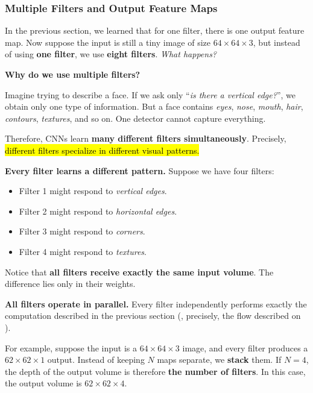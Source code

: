 \subsubsection{Multiple Filters and Output Feature Maps}\label{sec:multiple-filters-and-output-feature-maps}

In the previous section, we learned that for one filter, there is one output feature map. Now suppose the input is still a tiny image of size $64 \times 64 \times 3$, but instead of using \textbf{one filter}, we use \textbf{eight filters}. \emph{What happens?}

\highspace
\begin{flushleft}
    \textcolor{Green3}{ \textbf{Why do we use multiple filters?}}
\end{flushleft}
Imagine trying to describe a face. If we ask only ``\emph{is there a vertical edge?}'', we obtain only one type of information. But a face contains \emph{eyes}, \emph{nose}, \emph{mouth}, \emph{hair}, \emph{contours}, \emph{textures}, and so on. One detector cannot capture everything.

\highspace
Therefore, CNNs learn \textbf{many different filters simultaneously}. Precisely, \hl{different filters specialize in different visual patterns.}

\highspace
\textcolor{Green3}{ \textbf{Every filter learns a different pattern.}} Suppose we have four filters:
\begin{itemize}
    \item Filter 1 might respond to \emph{vertical edges}.
    \item Filter 2 might respond to \emph{horizontal edges}.
    \item Filter 3 might respond to \emph{corners}.
    \item Filter 4 might respond to \emph{textures}.
\end{itemize}
Notice that \textbf{all filters receive exactly the same input volume}. The difference lies only in their weights.

\highspace
\textcolor{Green3}{ \textbf{All filters operate in parallel.}} Every filter independently performs exactly the computation described in the previous section (, precisely, the flow described on ).

\highspace
For example, suppose the input is a $64 \times 64 \times 3$ image, and every filter produces a $62 \times 62 \times 1$ output. Instead of keeping $N$ maps separate, we \textbf{stack} them. If $N = 4$, the depth of the output volume is therefore \textbf{the number of filters}. In this case, the output volume is $62 \times 62 \times 4$.

